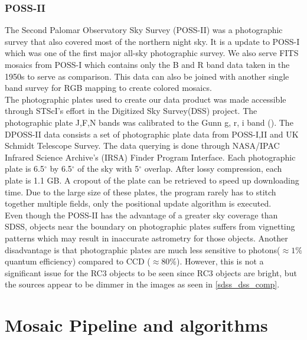 \documentclass[5p]{elsarticle}
\begin{document}
	\subsubsection{POSS-II}
	The Second Palomar Observatory Sky Survey (POSS-II) was a photographic survey that also covered most of the northern night sky. It is a update to POSS-I which was one of the first major all-sky photographic survey. We also serve FITS mosaics from POSS-I which contains only the B and R band data taken in the 1950s to serve as comparison. This data can also be joined with another single band survey  for RGB mapping to create colored mosaics.
\\
\indent	The photographic plates used to create our data product was made accessible through  STScI's effort in the Digitized Sky Survey(DSS) project. The photographic plate J,F,N bands was calibrated to the Gunn g, r, i band (\citealp{dposs}). The DPOSS-II data consists a set of  photographic plate data from POSS-I,II and UK Schmidt Telescope Survey. The data querying is done  through NASA/IPAC Infrared Science Archive's  (IRSA) Finder Program Interface. Each photographic plate is 6.5$^{\circ}$ by 6.5$^{\circ}$ of the sky with 5$^{\circ}$ overlap. After lossy compression, each plate is 1.1 GB. A cropout of the plate  can be retrieved  to speed up downloading time. Due to the large size of these plates, the program rarely has to stitch together multiple fields, only the positional update algorithm is executed.
\\
\indent Even though the POSS-II has the advantage of a  greater sky coverage than SDSS, objects near the boundary on photographic plates suffers from vignetting patterns which may result in inaccurate astrometry for those objects.	Another disadvantage is that photographic plates are much less sensitive to photons($\approx 1\%$ quantum efficiency) compared to  CCD  ($\approx 80\%$). However, this is not a significant issue for the RC3 objects to be seen since RC3 objects are bright, but the sources appear to be dimmer in the images as seen in \autoref{sdss_dss_comp}. 
\section{Mosaic Pipeline and algorithms}
\end{document}

